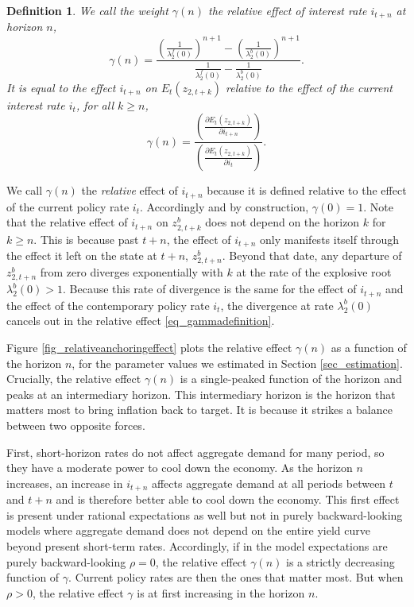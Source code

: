\documentclass{article}
\newtheorem{definition}{Definition}
\begin{document}
\begin{definition}\label{def_relativeanchoringeffect}
We call the weight $\gamma(n)$ the relative effect of interest rate $i_{t+n}$ at horizon $n$,
\begin{equation}
\gamma(n) = \frac{\left(\frac{1}{\lambda^f_2(0)}\right)^{n+1} - \left(\frac{1}{\lambda^b_2(0)}\right)^{n+1}}
{\frac{1}{\lambda^f_2(0)}-\frac{1}{\lambda^b_2(0)}}.
\end{equation}
It is equal to the effect $i_{t+n}$ on $E_t(z_{2,t+k})$ relative to the effect of the current interest rate $i_t$, for all $k\geq n$,
\begin{equation}
\gamma(n) = \frac{\left(\frac{\partial E_t(z_{2,t+k})}{\partial i_{t+n}}\right)}{\left(\frac{\partial E_t(z_{2,t+k})}{\partial i_{t}}\right)}.\label{eq_gammadefinition}
\end{equation}
\end{definition}
We call $\gamma(n)$ the \emph{relative} effect of $i_{t+n}$ because it is defined relative to the effect of the current policy rate $i_t$.
Accordingly and by construction, $\gamma(0)=1$. Note that the relative effect of $i_{t+n}$ on $z^b_{2,t+k}$ does not depend on the horizon $k$ for $k\geq n$. This is because past $t+n$, the effect of $i_{t+n}$ only manifests itself through the effect it left on the state at $t+n$, $z^b_{2,t+n}$. Beyond that date, any departure of $z^b_{2,t+n}$ from zero diverges exponentially with $k$ at the rate of the explosive root $\lambda^b_2(0)>1$. Because this rate of divergence is the same for the effect of $i_{t+n}$ and the effect of the contemporary policy rate $i_t$, the divergence at rate $\lambda^b_2(0)$ cancels out in the relative effect \eqref{eq_gammadefinition}.

Figure \ref{fig_relativeanchoringeffect} plots the relative effect $\gamma(n)$ as a function of the horizon $n$, for the parameter values we estimated in Section \ref{sec_estimation}. Crucially, the relative effect $\gamma(n)$ is a single-peaked function of the horizon and peaks at an intermediary horizon. This intermediary horizon is the horizon that matters most to bring inflation back to target. It is because it strikes a balance between two opposite forces.

First, short-horizon rates do not affect aggregate demand for many period, so they have a moderate power to cool down the economy. As the horizon $n$ increases, an increase in $i_{t+n}$ affects aggregate demand at all periods between $t$ and $t+n$ and is therefore better able to cool down the economy. This first effect is present under rational expectations as well but not in purely backward-looking models where aggregate demand does not depend on the entire yield curve beyond present short-term rates. Accordingly, if in the model expectations are purely backward-looking $\rho=0$, the relative effect $\gamma(n)$ is a strictly decreasing function of $\gamma$. Current policy rates are then the ones that matter most. But when $\rho>0$, the relative effect $\gamma$ is at first increasing in the horizon $n$.
\end{document}
